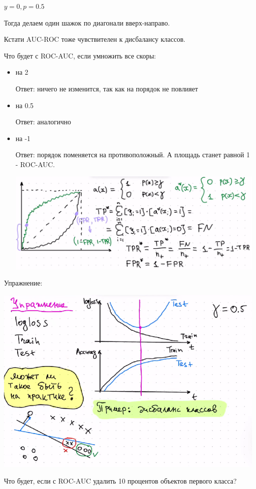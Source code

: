 \documentclass[12pt]{article}
\begin{document}
\begin{itemize}
$y = 0, p = 0.5$

Тогда делаем один шажок по диагонали вверх-направо. 

Кстати AUC-ROC тоже чувствителен к дисбалансу классов.

Что будет с ROC-AUC, если умножить все скоры:

\begin{itemize}
\item на 2

Ответ: ничего не изменится, так как на порядок не повлияет
\item на 0.5

Ответ: аналогично
\item на -1

Ответ: порядок поменяется на противоположный. А площадь станет равной 1 - ROC-AUC.

\includegraphics[width=15cm]{auc-roc-q.png}
\end{itemize}

Упражнение:

\includegraphics[width=15cm]{logloss-q.png}

Что будет, если с ROC-AUC удалить 10 процентов объектов первого класса?


\end{itemize}
\end{document}
